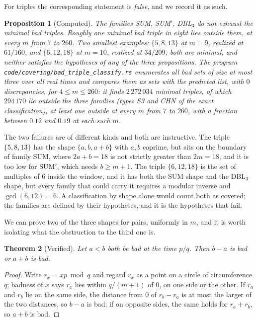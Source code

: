 \documentclass[11pt]{amsart}
\theoremstyle{plain}
\newtheorem{theorem}{Theorem}[section]
\newtheorem{proposition}[theorem]{Proposition}
\theoremstyle{definition}
\begin{document}
For triples the corresponding statement is \emph{false}, and we record it as such.

\begin{proposition}[Computed]\label{prop:triples-incomplete}
The families SUM, SUM$'$, DBL$_3$ do not exhaust the minimal bad triples. Roughly one minimal bad
triple in eight lies outside them, at every $m$ from $7$ to $260$. Two smallest examples:
$\{5,8,13\}$ at $m = 9$, realized at $61/160$, and $\{6,12,18\}$ at $m = 10$, realized at
$34/209$; both are minimal, and neither satisfies the hypotheses of any of the three propositions.
The program \texttt{code/covering/bad\_triple\_classify.rs} enumerates all bad sets of size at most three over all real times and compares them as sets with the predicted list, with $0$ discrepancies, for $4\le m\le260$: it finds $2\,272\,034$ minimal triples, of which $294\,170$ lie outside the three families (types S3 and CHN of the exact classification), at least one outside at every $m$ from $7$ to $260$, with a fraction between $0.12$ and $0.19$ at each such $m$.
\end{proposition}

The two failures are of different kinds and both are instructive. The triple $\{5,8,13\}$ has the
shape $\{a,b,a+b\}$ with $a,b$ coprime, but sits on the boundary of family SUM, where
$2a+b = 18$ is not strictly greater than $2m = 18$, and it is too low for SUM$'$, which needs
$b \ge m+1$. The triple $\{6,12,18\}$ is the set of multiples of $6$ inside the window, and it has
both the SUM shape and the DBL$_3$ shape, but every family that could carry it requires a modular
inverse and $\gcd(6,12) = 6$. A classification by shape alone would count both as covered; the
families are defined by their hypotheses, and it is the hypotheses that fail.

We can prove two of the three shapes for pairs, uniformly in $m$, and it is worth isolating what
the obstruction to the third one is.

\begin{theorem}[Verified]\label{thm:pairdich}
Let $a < b$ both be bad at the time $p/q$. Then $b-a$ is bad or $a+b$ is bad.
\end{theorem}

\begin{proof}
Write $r_x = xp \bmod q$ and regard $r_x$ as a point on a circle of circumference $q$; badness of
$x$ says $r_x$ lies within $q/(m+1)$ of $0$, on one side or the other. If $r_a$ and $r_b$ lie on the
same side, the distance from $0$ of $r_b - r_a$ is at most the larger of the two distances, so
$b-a$ is bad; if on opposite sides, the same holds for $r_a + r_b$, so $a+b$ is bad.
\end{proof}
\end{document}
